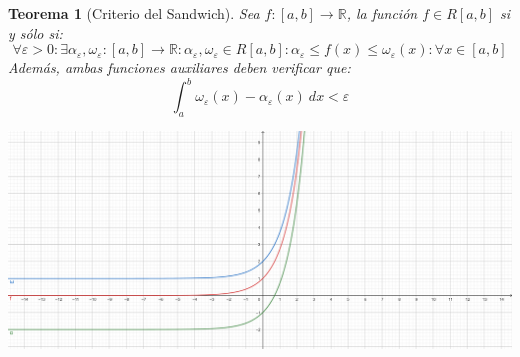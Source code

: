 \documentclass[10pt,a4paper,openright]{book}
\theoremstyle{break}
\newtheorem*{theo}{Teorema}
\newcommand{\dif}[1]{\ d#1}
\begin{document}
\begin{theo}[Criterio del Sandwich]
Sea $f:[a,b]\rightarrow \mathbb R$, la función $f\in R[a,b]$ si y sólo si:
$$\forall \varepsilon >0 : \exists \alpha_\varepsilon, \omega_\varepsilon: [a,b]\rightarrow \mathbb R : \alpha_\varepsilon, \omega_\varepsilon \in R[a,b]: \alpha_\varepsilon \leq f(x)\leq \omega_\varepsilon (x): \forall x\in [a,b]$$
Además, ambas funciones auxiliares deben verificar que:
$$\int_{a}^{b} \omega_\varepsilon(x)-\alpha_\varepsilon(x) \dif{x} < \varepsilon$$
\begin{center}
\includegraphics[scale=0.45]{criterio sandwich para integrales}
\end{center}
\end{theo}
\end{document}
